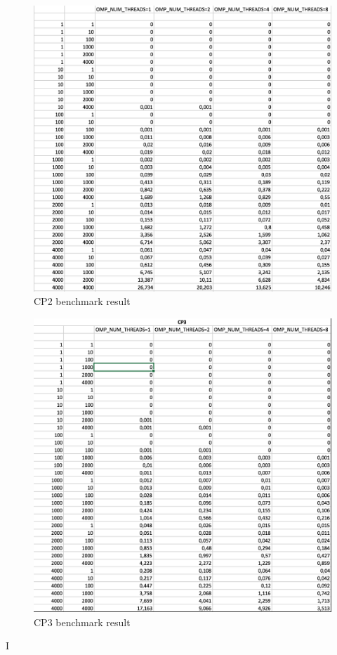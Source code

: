 \documentclass[a4paper,10pt]{article}
\begin{document}
\begin{figure}[H]
\centering
\includegraphics[width=1\textwidth]{figures/w2_cp2}
\caption{CP2 benchmark result}
\label{fig:pca_type}
\end{figure}

\begin{figure}[H]
\centering
\includegraphics[width=1\textwidth]{figures/w2_cp3}
\caption{CP3 benchmark result}
\label{fig:pca_type}
\end{figure}


I
\end{document}
